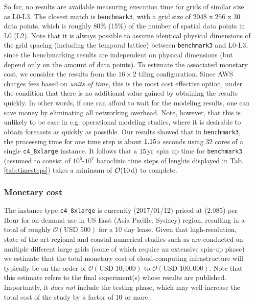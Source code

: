 \documentclass[12pt,a4paper]{article}
\begin{document}
So far, no results are available measuring execution time for grids of similar size as L0-L3. The closest match is \verb|benchmark3|, with a grid size of $2048$ x $256$ x $30$ data points, which is roughly 80\% (15\%) of the number of spatial data points in L0 (L2). Note that it is always possible to assume identical physical dimensions of the grid spacing (including the temporal lattice) between \verb|benchmark3| and L0-L3, since the benchmarking results are independent on physical dimensions (but depend only on the amount of data points). To estimate the associated monetary cost, we consider the results from the $16\times2$ tiling configuration. Since AWS charges fees based on \emph{units of time}, this is the most cost effective option, under the condition that there is no additional value gained by obtaining the results quickly. In other words, if one can afford to wait for the modeling results, one can save money by eliminating all networking overhead. Note, however, that this is unlikely to be case in e.g. operational modeling studies, where it is desirable to obtain forecasts as quickly as possible. Our results showed that in \verb|benchmark3|, the processing time for one time step is about $1.15\,\rm s$ seconds using 32 cores of a single \verb|c4_8xlarge| instance.  It follows that a $15\,\rm yr$ spin up time for \verb|benchmark3|  (assumed to consist of $10^6$-$10^7$ baroclinic time steps of lenghts displayed in Tab. \ref{tab:timesteps}) takes a minimum of $\mathcal{O}(10\,\rm d)$ to complete.

\subsubsection{Monetary cost}

The instance type \verb|c4_8xlarge| is currently (2017/01/12) priced at  (2.085) per Hour for on-demand use in US East (Asia Pacific, Sydney) region, resulting in a total of roughly $\mathcal{O}(\text{USD } 500)$ for a 10 day lease. Given that high-resolution, state-of-the-art regional and coastal numerical studies such as  \cite{kumar2015midshelf} are conducted on multiple different large grids (some of which require an extensive spin-up phase) we estimate that the total monetary cost of cloud-computing infrastructure will typically be on the order of $\mathcal{O}(\text{USD } 10,000)$ to $\mathcal{O}(\text{USD } 100,000)$. Note that this estimate refers to the final experiment(s) whose results are published. Importantly, it \emph{does not} include the testing phase, which may well increase the total cost of the study by a factor of 10 or more. 
\end{document}
